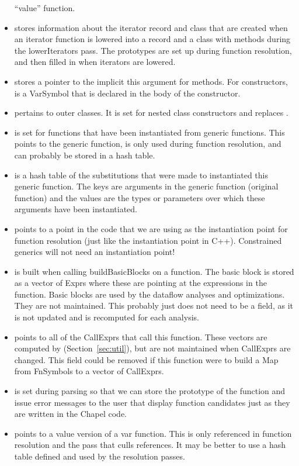 \documentclass[10pt]{article}
\begin{document}
\begin{itemize}
  ``value'' function.
\item {} stores information about the
  iterator record and class that are created when an iterator function
  is lowered into a record and a class with methods during the
  lowerIterators pass.  The prototypes are set up during function
  resolution, and then filled in when iterators are lowered.
\item {} stores a pointer to the implicit this
  argument for methods.  For constructors,  is a VarSymbol
    that is declared in the body of the constructor.
\item {} pertains to outer classes.  It is set for
  nested class constructors and replaces .
\item {} is set for functions that have
  been instantiated from generic functions.  This points to the
  generic function, is only used during function resolution, and can
  probably be stored in a hash table.
\item {} is a hash table of the
  substitutions that were made to instantiated this generic function.
  The keys are arguments in the generic function (original function)
  and the values are the types or parameters over which these
  arguments have been instantiated.
\item {} points to a point in the code
  that we are using as the instantiation point for function resolution
  (just like the instantiation point in C++).  Constrained generics
  will not need an instantiation point!
\item {} is built when calling
  buildBasicBlocks on a function.  The basic block is stored as a
  vector of Exprs where these are pointing at the expressions in the
  function.  Basic blocks are used by the dataflow analyses and
  optimizations.  They are not maintained.  This probably just does
  not need to be a field, as it is not updated and is recomputed for
  each analysis.
\item {} points to all of the CallExprs
  that call this function.  These vectors are computed by
   (Section~\ref{sec:util}), but are not
  maintained when CallExprs are changed.  This field could be removed if
  this function were to build a Map from FnSymbols to a vector of
  CallExprs.
\item {} is set during parsing so that we can
  store the prototype of the function and issue error messages to the
  user that display function candidates just as they are written in
  the Chapel code.
\item {} points to a value version of a var
  function.  This is only referenced in function resolution and the
  pass that culls references.  It may be better to use a hash table
  defined and used by the resolution passes.
\end{itemize}
\end{document}
